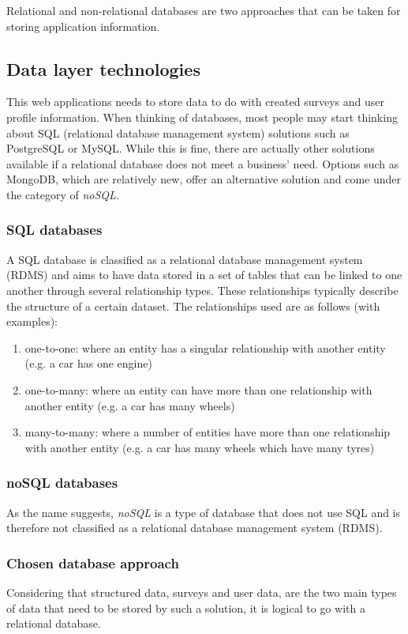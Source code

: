 Relational and non-relational databases are two approaches that can be taken for storing application information.


\subsection{Data layer technologies}
This web applications needs to store data to do with created surveys and user profile information.
When thinking of databases, most people may start thinking about SQL (relational database management system) solutions such 
as PostgreSQL or MySQL.
While this is fine, there are actually other solutions available if a relational database does not meet a business' need. 
Options such as MongoDB, which are relatively new, offer an alternative solution and come under the category of \textit{noSQL}. 

\subsubsection*{SQL databases}
A SQL database is classified as a relational database management system (RDMS) and aims to have data stored in a set of tables that
can be linked to one another through several relationship types. These relationships typically describe the structure of a certain dataset.
The relationships used are as follows (with examples): 

\begin{enumerate}
    \item one-to-one: where an entity has a singular relationship with another entity (e.g. a car has one engine)
    \item one-to-many: where an entity can have more than one relationship with another entity (e.g. a car has many wheels)
    \item many-to-many: where a number of entities have more than one relationship with another entity (e.g. a car has many wheels which have many tyres)
\end{enumerate}

\subsubsection*{noSQL databases}
As the name suggests, \textit{noSQL} is a type of database that does not use SQL and is therefore not classified as a relational database
management system (RDMS).



\subsubsection*{Chosen database approach}
Considering that structured data, surveys and user data, are the two main types of data that need to be stored by such a solution, it is logical to go with a relational database.

